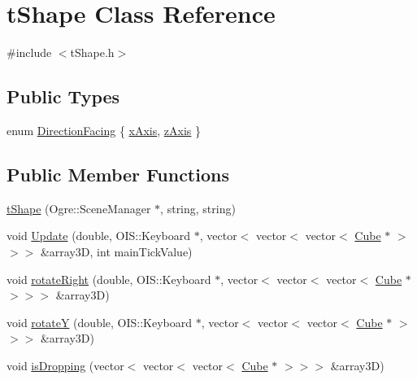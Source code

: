 \hypertarget{classt_shape}{\section{t\-Shape Class Reference}
\label{classt_shape}
}


{\ttfamily \#include $<$t\-Shape.\-h$>$}

\subsection*{Public Types}
\begin{DoxyCompactItemize}
\item 
enum \hyperlink{classt_shape_a193bb18f526dc3f027748fc231b577ae}{Direction\-Facing} \{ \hyperlink{classt_shape_a193bb18f526dc3f027748fc231b577aeae74a49141e9f311876d422f8016b1a29}{x\-Axis}, 
\hyperlink{classt_shape_a193bb18f526dc3f027748fc231b577aea5e1041e853e5ba9f0ec9461cc76f6fa4}{z\-Axis}
 \}
\end{DoxyCompactItemize}
\subsection*{Public Member Functions}
\begin{DoxyCompactItemize}
\item 
\hyperlink{classt_shape_ad6e92496392d351fee71ffa004e53ec6}{t\-Shape} (Ogre\-::\-Scene\-Manager $\ast$, string, string)
\item 
void \hyperlink{classt_shape_a51c0e39d0e8d89872ba1973e9949d2bd}{Update} (double, O\-I\-S\-::\-Keyboard $\ast$, vector$<$ vector$<$ vector$<$ \hyperlink{class_cube}{Cube} $\ast$ $>$$>$$>$ \&array3\-D, int main\-Tick\-Value)
\item 
void \hyperlink{classt_shape_ab4c52b54568e2934ade12889cbad9023}{rotate\-Right} (double, O\-I\-S\-::\-Keyboard $\ast$, vector$<$ vector$<$ vector$<$ \hyperlink{class_cube}{Cube} $\ast$ $>$$>$$>$ \&array3\-D)
\item 
void \hyperlink{classt_shape_a8ac2a90e601d1c95122d00da5da2e035}{rotate\-Y} (double, O\-I\-S\-::\-Keyboard $\ast$, vector$<$ vector$<$ vector$<$ \hyperlink{class_cube}{Cube} $\ast$ $>$$>$$>$ \&array3\-D)
\item 
void \hyperlink{classt_shape_a4abc7fa2f46c54ad12671cba522baef4}{is\-Dropping} (vector$<$ vector$<$ vector$<$ \hyperlink{class_cube}{Cube} $\ast$ $>$$>$$>$ \&array3\-D)
\end{DoxyCompactItemize}
